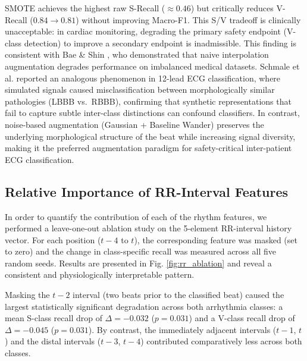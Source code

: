 \documentclass[journal,twoside,web]{ieeecolor}
\begin{document}
SMOTE achieves the highest raw S-Recall ($\approx 0.46$) but critically reduces V-Recall ($0.84 \to 0.81$) without improving Macro-F1. This S/V tradeoff is clinically unacceptable: in cardiac monitoring, degrading the primary safety endpoint (V-class detection) to improve a secondary endpoint is inadmissible. This finding is consistent with Bae \& Shin \cite{bae_handling_2025}, who demonstrated that naive interpolation augmentation degrades performance on imbalanced medical datasets. Schmale et al. \cite{schmale_curriculum_2025} reported an analogous phenomenon in 12-lead ECG classification, where simulated signals caused misclassification between morphologically similar pathologies (LBBB vs.\ RBBB), confirming that synthetic representations that fail to capture subtle inter-class distinctions can confound classifiers. In contrast, noise-based augmentation (Gaussian + Baseline Wander) preserves the underlying morphological structure of the beat while increasing signal diversity, making it the preferred augmentation paradigm for safety-critical inter-patient ECG classification.

\subsection{Relative Importance of RR-Interval Features}

In order to quantify the contribution of each of the rhythm features, we performed a leave-one-out ablation study on the 5-element RR-interval history vector. For each position ($t - 4$ to $t$), the corresponding feature was masked (set to zero) and the change in class-specific recall was measured across all five random seeds. Results are presented in Fig. \ref{fig:rr_ablation} and reveal a consistent and physiologically interpretable pattern.

Masking the $t - 2$ interval (two beats prior to the classified beat) caused the largest statistically significant degradation across both arrhythmia classes: a mean S-class recall drop of $\Delta = -0.032$ ($p = 0.031$) and a V-class recall drop of $\Delta = -0.045$ ($p = 0.031$). By contrast, the immediately adjacent intervals ($t - 1$, $t$) and the distal intervals ($t - 3$, $t - 4$) contributed comparatively less across both classes.
\end{document}
